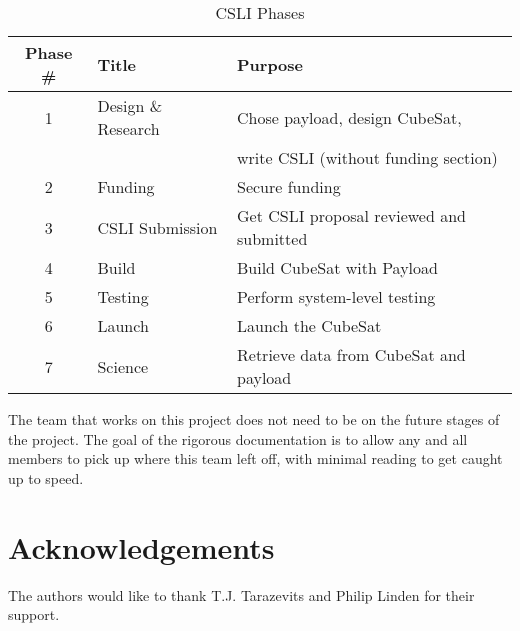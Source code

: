 \documentclass[conference]{IEEEtran} %
\begin{document}
\begin{table}[h!]
    \caption{CSLI Phases}
    \centering
    \begin{tabular}{@{}cll@{}}
    \toprule
    Phase \# & Title & Purpose \\
    \midrule
    1 & Design \& Research & Chose payload, design CubeSat, \\
      &                    & write CSLI (without funding section) \\
    2 & Funding & Secure funding \\
    3 & CSLI Submission & Get CSLI proposal reviewed and submitted \\
    4 & Build & Build CubeSat with Payload \\
    5 & Testing & Perform system-level testing \\
    6 & Launch & Launch the CubeSat \\
    7 & Science & Retrieve data from CubeSat and payload \\
    \bottomrule
    \end{tabular}
\label{tab:phases}
\end{table}

The team that works on this project does not need to be on the future stages of the project. The goal of the rigorous documentation is to allow any and all members
to pick up where this team left off, with minimal reading to get caught up to speed.
\section*{Acknowledgements}
The authors would like to thank T.J. Tarazevits and Philip Linden for their support.
%
%

\onecolumn
\appendices{}
\end{document}
